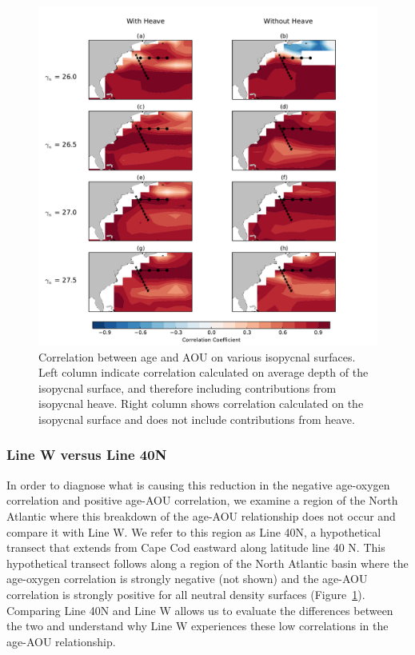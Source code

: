\begin{figure}
\centering
\includegraphics[width=\linewidth]{age_aou_corr_iso_sfc.pdf}
\caption{Correlation between age and AOU on various isopycnal surfaces. Left column indicate correlation calculated on average depth of the isopycnal surface, and therefore including contributions from isopycnal heave. Right column shows correlation calculated on the isopycnal surface and does not include contributions from heave.}
\label{fig:iso_correlations}
\end{figure}

\subsubsection{Line W versus Line 40N}
In order to diagnose what is causing this reduction in the negative age-oxygen
correlation and positive age-AOU correlation, we examine a region of the North
Atlantic where this breakdown of the age-AOU relationship does not occur and compare
it with Line W. We refer to this region as Line 40N, a hypothetical transect that
extends from Cape Cod eastward along latitude line 40 N. This hypothetical
transect follows along a region of the North Atlantic basin where the age-oxygen
correlation is strongly negative (not shown) and the age-AOU correlation is
strongly positive for all neutral density surfaces (Figure~\ref{fig:iso_correlations}).
Comparing Line 40N and Line W allows us to evaluate the differences between the
two and understand why Line W experiences these low correlations in the age-AOU
relationship.

